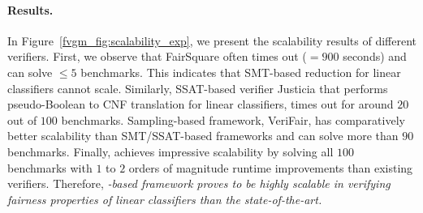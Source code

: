 \paragraph{Results.} In Figure~\ref{fvgm_fig:scalability_exp}, we present the scalability results of different verifiers. First, we observe that FairSquare often times out ($ =900 $ seconds) and can solve $ \le 5 $ benchmarks. This indicates that SMT-based reduction for linear classifiers cannot scale. Similarly, SSAT-based verifier Justicia that performs pseudo-Boolean to CNF translation for linear classifiers, times out for around $  20 $ out of $ 100 $ benchmarks. Sampling-based framework, VeriFair, has comparatively better scalability than SMT/SSAT-based frameworks and can solve more than $ 90 $ benchmarks. Finally, {\fvgm} achieves impressive scalability by solving all $ 100 $ benchmarks with $ 1 $ to $ 2 $ orders of magnitude runtime improvements than existing verifiers. Therefore,\textit{ {\stochastic}-based framework {\fvgm} proves to be highly scalable in verifying fairness properties of linear classifiers than the state-of-the-art.} 

